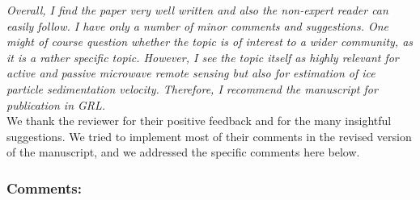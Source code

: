 \documentclass[12pt]{article}
\begin{document}
\textit{Overall, I find the paper very well written and also the non-expert reader can easily follow. I have only a number of minor comments and suggestions. One might of course question whether the topic is of interest to a wider community, as it is a rather specific topic. However, I see the topic itself as highly relevant for active and passive microwave remote sensing but also for estimation of ice particle sedimentation velocity. Therefore, I recommend the manuscript for publication in GRL.}\\

\noindent
We thank the reviewer for their positive feedback and for the many insightful suggestions. We tried to implement most of their comments in the revised version of the manuscript, and we addressed the specific comments here below. 

\subsubsection*{Comments:}
\end{document}

